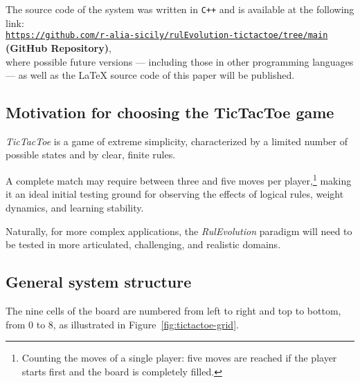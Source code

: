 \documentclass[12pt,a4paper]{article}
\begin{document}
The source code of the system was written in \texttt{C++} and is available at the following link:\\
\href{https://github.com/r-alia-sicily/rulEvolution-tictactoe/tree/main}
{\texttt{https://github.com/r-alia-sicily/rulEvolution-tictactoe/tree/main}} \textbf{(GitHub Repository)},\\
where possible future versions — including those in other programming languages — as well as the \LaTeX{} source code of this paper will be published.

\subsection{Motivation for choosing the TicTacToe game}

\textit{TicTacToe} is a game of extreme simplicity, characterized by a limited number of possible states and by clear, finite rules.

A complete match may require between three and five moves per player,\footnote{Counting the moves of a single player: five moves are reached if the player starts first and the board is completely filled.}
making it an ideal initial testing ground for observing the effects of logical rules, weight dynamics, and learning stability.

Naturally, for more complex applications, the \textit{RulEvolution} paradigm will need to be tested in more articulated, challenging, and realistic domains.

\subsection{General system structure}

The nine cells of the board are numbered from left to right and top to bottom, from 0 to 8, as illustrated in Figure~\ref{fig:tictactoe-grid}.  
\end{document}
